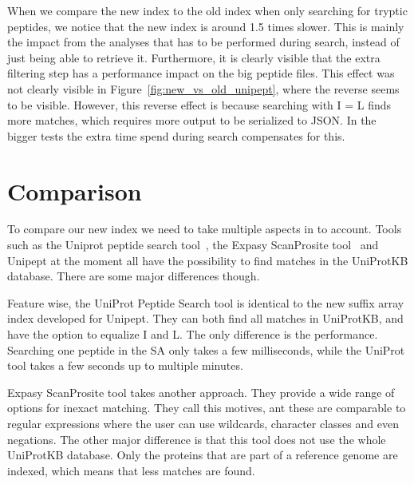 \documentclass[11pt]{article}
\newenvironment{Figure}
{\par\medskip\noindent\minipage{\linewidth}}
{\endminipage\par\medskip}
\begin{document}
\begin{multicols}{2}
\begin{Figure}
{            }
            \label{fig:new_vs_old_unipept}
        \end{Figure}
        When we compare the new index to the old index when only searching for tryptic peptides, we notice that the new index is around 1.5 times slower.
        This is mainly the impact from the analyses that has to be performed during search, instead of just being able to retrieve it.
        Furthermore, it is clearly visible that the extra filtering step has a performance impact on the big peptide files.
        This effect was not clearly visible in Figure~\ref{fig:new_vs_old_unipept}, where the reverse seems to be visible.
        However, this reverse effect is because searching with I = L finds more matches, which requires more output to be serialized to JSON\@.
        In the bigger tests the extra time spend during search compensates for this. %

        \section{Comparison}\label{sec:comparison}
        To compare our new index we need to take multiple aspects in to account.
        Tools such as the Uniprot peptide search tool~\cite{uniprot_search_site, uniprot_search_paper}, the Expasy ScanProsite tool~\cite{scanprosite} and Unipept at the moment all have the possibility to find matches in the UniProtKB database.
        There are some major differences though.

        Feature wise, the UniProt Peptide Search tool is identical to the new suffix array index developed for Unipept.
        They can both find all matches in UniProtKB, and have the option to equalize I and L\@.
        The only difference is the performance.
        Searching one peptide in the SA only takes a few milliseconds, while the UniProt tool takes a few seconds up to multiple minutes.

        Expasy ScanProsite tool takes another approach.
        They provide a wide range of options for inexact matching.
        They call this motives, ant these are comparable to regular expressions where the user can use wildcards, character classes and even negations.
        The other major difference is that this tool does not use the whole UniProtKB database.
        Only the proteins that are part of a reference genome are indexed, which means that less matches are found.


\end{multicols}
\end{document}
